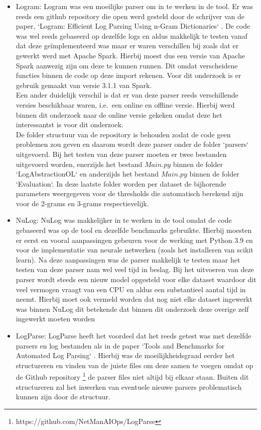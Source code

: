 \begin{itemize}
    \item Logram: Logram was een moeilijke parser om in te werken in de tool. Er was reeds een github repository die open werd gesteld door de schrijver van de paper, `Logram: Efficient Log Parsing Using n-Gram Dictionaries` \autocite{dai2020logram}. De code was wel reeds gebaseerd op dezelfde logs en aldus makkelijk te testen vanaf dat deze geïmplementeerd was maar er waren verschillen bij zoals dat er gewerkt werd met Apache Spark. Hierbij moest dus een versie van Apache Spark aanwezig zijn om deze te kunnen runnen. Dit omdat verscheidene functies binnen de code op deze import rekenen. Voor dit onderzoek is er gebruik gemaakt van versie 3.1.1 van Spark. \\
    
    Een ander duidelijk verschil is dat er van deze parser reeds verschillende versies beschikbaar waren, i.e.\ een online en offline versie. Hierbij werd binnen dit onderzoek naar de online versie gekeken omdat deze het interessantst is voor dit onderzoek.\\
    
    De folder structuur van de repository is behouden zodat de code geen problemen zou geven en daarom wordt deze parser onder de folder `parsers` uitgevoerd. Bij het testen van deze parser moeten er twee bestanden uitgevoerd worden, enerzijds het bestand $Main.py$ binnen de folder `LogAbstractionOL` en anderzijds het bestand $Main.py$ binnen de folder `Evaluation`. In deze laatste folder worden per dataset de bijhorende parameters weergegeven voor de thresholds die automatisch berekend zijn voor de 2-grams en 3-grams respectievelijk.\\
    
    \item NuLog: NuLog was makkelijker in te werken in de tool omdat de code gebaseerd was op de tool en dezelfde benchmarks gebruikte. Hierbij moesten er eerst en vooral aanpassingen gebeuren voor de werking met Python 3.9 en voor de implementatie van neurale netwerken (zoals het installeren van scikit learn). Na deze aanpassingen was de parser makkelijk te testen maar het testen van deze parser nam wel veel tijd in beslag. Bij het uitvoeren van deze parser wordt steeds een nieuw model opgesteld voor elke dataset waardoor dit veel vermogen vraagt van een CPU en aldus een substantieel aantal tijd in neemt. Hierbij moet ook vermeld worden dat nog niet elke dataset ingewerkt was binnen NuLog dit betekende dat binnen dit onderzoek deze overige zelf ingewerkt moeten worden
    
    \item LogParse: LogParse heeft het voordeel dat het reeds getest was met dezelfde parsers en log bestanden als in de paper `Tools and Benchmarks for Automated Log Parsing` \autocite{TBA2019}. Hierbij was de moeilijkheidsgraad eerder het structureren en vinden van de juiste files om deze samen te voegen omdat op de Github repository \footnote{https://github.com/NetManAIOps/LogParse} de parser files niet altijd bij elkaar staan. Buiten dit structureren zal het inwerken van eventuele nieuwe parsers problematisch kunnen zijn door de structuur.
\end{itemize}

